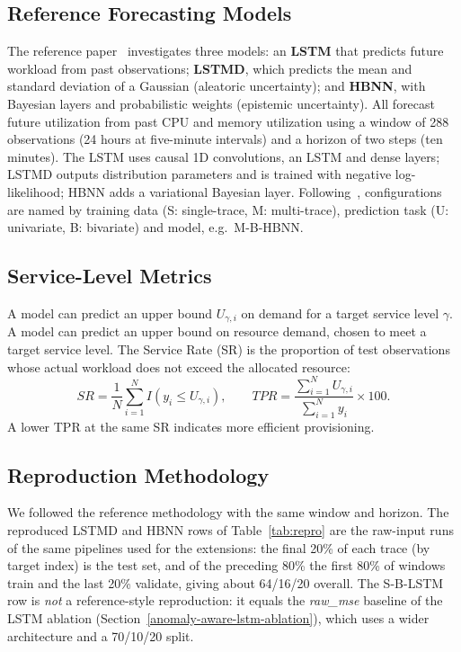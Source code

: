 \documentclass[conference]{IEEEtran}
\begin{document}
\subsection{Reference Forecasting Models}\label{forecasting-models}

The reference paper~\cite{ref1} investigates three models: an \textbf{LSTM}
that predicts future workload from past observations; \textbf{LSTMD}, which
predicts the mean and standard deviation of a Gaussian (aleatoric uncertainty);
and \textbf{HBNN}, with Bayesian layers and probabilistic weights (epistemic
uncertainty). All forecast future utilization from past CPU and memory
utilization using a window of 288 observations (24 hours at five-minute
intervals) and a horizon of two steps (ten minutes). The LSTM uses causal 1D
convolutions, an LSTM and dense layers; LSTMD outputs distribution parameters
and is trained with negative log-likelihood; HBNN adds a variational Bayesian
layer. Following~\cite{ref1}, configurations are named by training data (S:
single-trace, M: multi-trace), prediction task (U: univariate, B: bivariate) and
model, e.g.\ M-B-HBNN.

\subsection{Service-Level Metrics}\label{service-level-metrics}

A model can predict an upper bound $U_{\gamma,i}$ on demand for a target
service level $\gamma$. A model can predict an upper bound on resource demand,
chosen to meet a target service level. The Service Rate (SR) is the
proportion of test observations whose actual workload does not exceed the allocated resource:
\begin{equation}
SR = \frac{1}{N}\sum_{i=1}^{N} I(y_i \leq U_{\gamma,i}),\qquad
TPR = \frac{\sum_{i=1}^{N} U_{\gamma,i}}{\sum_{i=1}^{N} y_i}\times 100.
\end{equation}
A lower TPR at the same SR indicates more efficient provisioning.

\subsection{Reproduction Methodology}\label{reproduction-methodology}

We followed the reference methodology with the same window and horizon. The
reproduced LSTMD and HBNN rows of Table~\ref{tab:repro} are the raw-input runs of
the same pipelines used for the extensions: the final 20\% of each trace (by
target index) is the test set, and of the preceding 80\% the first 80\% of
windows train and the last 20\% validate, giving about 64/16/20 overall. The
S-B-LSTM row is \emph{not} a reference-style reproduction: it equals the
\emph{raw\_mse} baseline of the LSTM ablation (Section~\ref{anomaly-aware-lstm-ablation}),
which uses a wider architecture and a 70/10/20 split.
\end{document}

